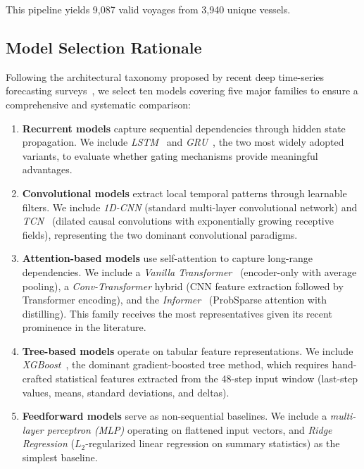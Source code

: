 \documentclass[conference]{IEEEtran}
\begin{document}
This pipeline yields 9,087 valid voyages from 3,940 unique vessels.

\subsection{Model Selection Rationale}
\label{sec:model_selection}

Following the architectural taxonomy proposed by recent deep time-series forecasting surveys~\cite{kim2025comprehensive, zeng2023transformers}, we select ten models covering five major families to ensure a comprehensive and systematic comparison:

\begin{enumerate}
    \item \textbf{Recurrent models} capture sequential dependencies through hidden state propagation. We include \textit{LSTM}~\cite{hochreiter1997lstm} and \textit{GRU}~\cite{cho2014gru}, the two most widely adopted variants, to evaluate whether gating mechanisms provide meaningful advantages.

    \item \textbf{Convolutional models} extract local temporal patterns through learnable filters. We include \textit{1D-CNN} (standard multi-layer convolutional network) and \textit{TCN}~\cite{bai2018tcn} (dilated causal convolutions with exponentially growing receptive fields), representing the two dominant convolutional paradigms.

    \item \textbf{Attention-based models} use self-attention to capture long-range dependencies. We include a \textit{Vanilla Transformer}~\cite{vaswani2017attention} (encoder-only with average pooling), a \textit{Conv-Transformer} hybrid (CNN feature extraction followed by Transformer encoding), and the \textit{Informer}~\cite{zhou2021informer} (ProbSparse attention with distilling). This family receives the most representatives given its recent prominence in the literature.

    \item \textbf{Tree-based models} operate on tabular feature representations. We include \textit{XGBoost}~\cite{chen2016xgboost}, the dominant gradient-boosted tree method, which requires hand-crafted statistical features extracted from the 48-step input window (last-step values, means, standard deviations, and deltas).

    \item \textbf{Feedforward models} serve as non-sequential baselines. We include a \textit{multi-layer perceptron (MLP)} operating on flattened input vectors, and \textit{Ridge Regression} ($L_2$-regularized linear regression on summary statistics) as the simplest baseline.


\end{enumerate}
\end{document}
